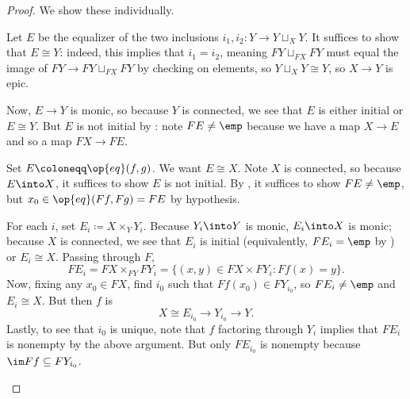 \documentclass{amsart}
\begin{document}
\begin{proof}
    We show these individually.
    \begin{listalph}
        \item Let $E$ be the equalizer of the two inclusions $i_1,i_2\colon Y\to Y\sqcup_XY$. It suffices to show that $E\cong Y$: indeed, this implies that $i_1=i_2$, meaning $FY\sqcup_{FX}FY$ must equal the image of $FY\to FY\sqcup_{FX}FY$ by checking on elements, so $Y\sqcup_XY\cong Y$, so $X\to Y$ is epic.

        Now, $E\to Y$ is monic, so because $Y$ is connected, we see that $E$ is either initial or $E\cong Y$. But $E$ is not initial by : note $FE\ne\emp$ because we have a map $X\to E$ and so a map $FX\to FE$.

        \item Set $E\coloneqq\op{eq}(f,g)$. We want $E\cong X$. Note $X$ is connected, so because $E\into X$, it suffices to show $E$ is not initial. By , it suffices to show $FE\ne\emp$, but $x_0\in\op{eq}(Ff,Fg)=FE$ by hypothesis.

        \item For each $i$, set $E_i\coloneqq X\times_YY_i$. Because $Y_i\into Y$ is monic, $E_i\into X$ is monic; because $X$ is connected, we see that $E_i$ is initial (equivalently, $FE_i=\emp$ by ) or $E_i\cong X$. Passing through $F$,
        \[FE_i=FX\times_{FY}FY_i=\{(x,y)\in FX\times FY_i:Ff(x)=y\}.\]
        Now, fixing any $x_0\in FX$, find $i_0$ such that $Ff(x_0)\in FY_{i_0}$, so $FE_i\ne\emp$ and $E_i\cong X$. But then $f$ is
        \[X\cong E_{i_0}\to Y_{i_0}\to Y.\]
        Lastly, to see that $i_0$ is unique, note that $f$ factoring through $Y_i$ implies that $FE_i$ is nonempty by the above argument. But only $FE_{i_0}$ is nonempty because $\im Ff\subseteq FY_{i_0}$.


\end{listalph}
\end{proof}
\end{document}
